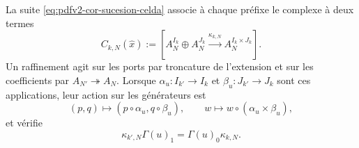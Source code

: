 La suite \eqref{eq:pdfv2-cor-sucesion-celda} associe à chaque préfixe le complexe à deux termes
\begin{equation}
\label{eq:pdfv2-cor-cono-celda}
 C_{k,N}(\widehat x):=
 \left[A_N^{I_k}\oplus A_N^{J_k}
 \xrightarrow{\kappa_{k,N}}A_N^{I_k\times J_k}\right].
\end{equation}
Un raffinement agit sur les ports par troncature de l'extension et sur les coefficients par \(A_{N'}\twoheadrightarrow A_N\). Lorsque \(\alpha_u:I_{k'}\to I_k\) et \(\beta_u:J_{k'}\to J_k\) sont ces applications, leur action sur les générateurs est
\begin{equation}
\label{eq:pdfv2-cor-refinamiento-celda}
 (p,q)\longmapsto(p\circ\alpha_u,q\circ\beta_u),
 \qquad
 w\longmapsto w\circ(\alpha_u\times\beta_u),
\end{equation}
et vérifie
\begin{equation}
\label{eq:pdfv2-cor-refinamiento-cadena}
 \kappa_{k',N}\Gamma(u)_1=\Gamma(u)_0\kappa_{k,N}.
\end{equation}

